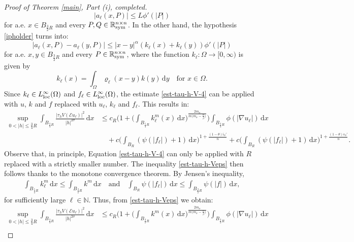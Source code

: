 \documentclass[leqno,11pt]{amsart}%
\numberwithin{equation}{section}
\newcommand{\N}{\mathbb N}
\def\N{\mathbb N}
\def\d{\mathrm{d}}
\def\E{\mathcal{E}}
\def\dx{\d x}
\theoremstyle{definition}
\numberwithin{equation}{section}
\begin{document}
\begin{proof}[Proof of Theorem \ref{main}, Part (i), completed]
\begin{equation}\label{B2b}
	| a_\ell(x,P)|\le L \phi'(|P|)
\end{equation}
for a.e. $x\in B_{\frac{3}{2}R}$ and every $P, Q \in \mathbb R^{n\times n}_{\rm sym}$. In the other hand, the hypothesis
\eqref{ipholder} turns into:
\begin{equation}\label{B3}
	| a_\ell(x,P)-a_\ell(y,P)|\le |x-y|^{{\alpha}}(k_\ell(x)+k_\ell(y))\phi'(|P|)
\end{equation}
for a.e. $x, y\in B_{\frac{3}{2}R}$ and
every $P \in \mathbb R^{n\times n}_{\rm sym}$,
	 where	 the function $k_\ell : \Omega \to [0, \infty)$ is given by
     $${k}_\ell(x)=\int_{\Omega}\varrho_\ell(x-y)k(y)\,\d y \quad \text{for $x\in \Omega$.}$$
Since  $k_\ell \in L^\infty_{\rm loc} (\Omega)$ and $f_\ell \in   L^\infty_{\rm loc} (\Omega)$, the estimate \eqref{est-tau-h-V-4} can be applied with $u$, $k$ and $f$ replaced with $u_\ell$, $k_\ell$ and $f_\ell$. This results in:
\begin{align}\label{est-tau-h-Veps}
 \sup_{0<|h|\leq  {
\frac34R}}\int_{B_{ {\frac 34R}}}\frac{|\tau_hV(\E u_\ell)|^2}{|h|^{2\sigma}}\,\dx
     & \le {c_R}
    \bigg(1+
       \bigg(\int_{B_{ {{\frac 54 R}}}}{k}_\ell^{{m}}(x)\,\dx\bigg)^{{\frac{2m_\sigma}{{m(m_\sigma}-\frac{n}{\beta})}}}  \bigg)  \int_{B_{\frac32R}}\phi(|\nabla u_\ell|)\,\dx\\\nonumber 
      &\quad+
   c
{\bigg(\int_{B_R}(\psi(|f_\ell|)+1)\,\dx\bigg)^{1+\frac{({1-\theta}) i_\phi'}{n}}
+c\bigg(\int_{B_{R}}(\psi(|f_\ell|)+1)\,\dx\bigg)^{1+\frac{({1-\theta}) s_\phi'}{n}}
       }.
  \end{align}
Observe that, in principle, Equation \eqref{est-tau-h-V-4} can only be applied with $R$ replaced with a strictly smaller number.   The inequality \eqref{est-tau-h-Veps} then follows thanks to the monotone convergence theorem.
By Jensen's inequality, 
\begin{align}
    \label{july66}
    \int_{B_{ {{\frac 54R}}}}k^{m}_\ell\,\dx \leq \int_{B_{ {\frac 32R}}}k^{m}\,\dx \quad \text{and} \quad  \int_{B_{ {{R}}}}\psi(|f_\ell|) \,\dx \leq \int_{B_{\frac 32R }}\psi(|f|) \,\dx,
\end{align}
for sufficiently large $\ell\in\N$.
Thus, from \eqref{est-tau-h-Veps} we obtain:
{\begin{align}\label{est-tau-h-Veps'}
 \sup_{0<|h|\leq \frac 34R}\int_{B_{ {\frac 34R}}}\frac{|\tau_hV(\E u_\ell)|^2}{|h|^{2\sigma}}\,\dx
     & \le {c_R}
    \bigg(1+
       \bigg(\int_{B_{ \frac 32 R}}{k}^{{m}}(x)\,\dx\bigg)^{{\frac{2m_\sigma}{{m(m_\sigma}-\frac{n}{\beta})}}}  \bigg)  \int_{B_{\frac32R}}\phi(|\nabla u_\ell|)\,\dx\\\nonumber 

\end{align}}
\end{proof}
\end{document}
